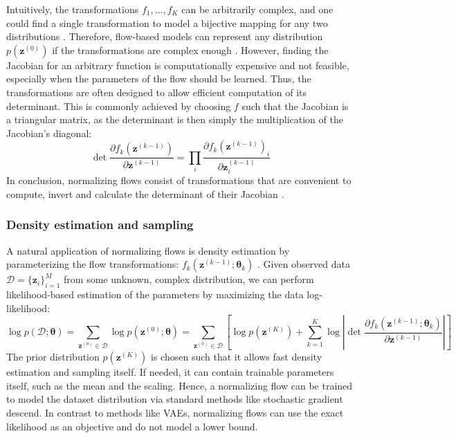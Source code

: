 Intuitively, the transformations $f_1,...,f_K$ can be arbitrarily complex, and one could find a single transformation to model a bijective mapping for any two distributions \cite{Bogachev_2005, NormalizingFlowsOverview}. 
Therefore, flow-based models can represent any distribution $p\left(\bm{z}^{(0)}\right)$ if the transformations are complex enough \cite{NormalizingFlowsOverview2}.
However, finding the Jacobian for an arbitrary function is computationally expensive and not feasible, especially when the parameters of the flow should be learned. 
Thus, the transformations are often designed to allow efficient computation of its determinant. 
This is commonly achieved by choosing $f$ such that the Jacobian is a triangular matrix, as the determinant is then simply the multiplication of the Jacobian's diagonal:
\begin{equation}
    \det \frac{\partial f_k(\bm{z}^{(k-1)})}{\partial \bm{z}^{(k-1)}} = \prod_{i} \frac{\partial {f_k(\bm{z}^{(k-1)})}_i}{\partial \bm{z}^{(k-1)}_i}
\end{equation}
In conclusion, normalizing flows consist of transformations that are convenient to compute, invert and calculate the determinant of their Jacobian \cite{NormalizingFlowsOverview}.

\subsubsection{Density estimation and sampling}
A natural application of normalizing flows is density estimation by parameterizing the flow transformations: $f_k(\bm{z}^{(k-1)};\bm{\theta}_k)$ \cite{NormalizingFlowsOverview}. Given observed data $\mathcal{D}=\{\bm{z}_i\}_{i=1}^{M}$ from some unknown, complex distribution, we can perform likelihood-based estimation of the parameters by maximizing the data log-likelihood:
\begin{equation}
    \log p(\mathcal{D};\bm{\theta}) 
    = \sum_{\bm{z}^{(0)} \in \mathcal{D}} \log p(\bm{z}^{(0)}; \bm{\theta}) 
    = \sum_{\bm{z}^{(0)} \in \mathcal{D}} \left[ \log p(\bm{z}^{(K)}) + \sum_{k=1}^{K} \log \left|\det \frac{\partial f_k(\bm{z}^{(k-1)}; \bm{\theta}_k)}{\partial \bm{z}^{(k-1)}}\right| \right]
\end{equation}
The prior distribution $p(\bm{z}^{(K)})$ is chosen such that it allows fast density estimation and sampling itself. 
If needed, it can contain trainable parameters itself, such as the mean and the scaling.
Hence, a normalizing flow can be trained to model the dataset distribution via standard methods like stochastic gradient descend. 
In contrast to methods like \acp{VAE}, normalizing flows can use the exact likelihood as an objective and do not model a lower bound.

